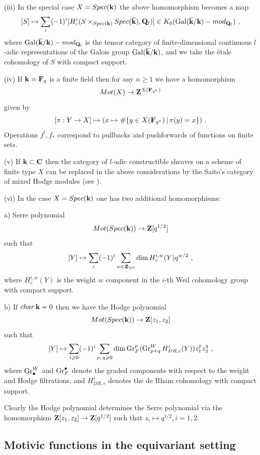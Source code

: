 \documentclass[12pt]{article}
\begin{document}
(iii) In the special case $X=Spec({\bf k})$ the above homomorphism becomes a map
$$[S]\mapsto \sum_i(-1)^i[H^i_{c}(S\times_{Spec ({\bf k})} Spec (\overline{{\bf k}}),{\bf Q}_l)]\in 
K_0(\operatorname{Gal}(\overline{{\bf k}}/{\bf k})-mod_{{\bf Q}_l})\,\,,$$
where $\operatorname{Gal}(\overline{{\bf k}}/{\bf k})-mod_{{\bf Q}_l}$ is the tensor category of finite-dimensional continuous
 $l$-adic representations of the Galois group $\operatorname{Gal}(\overline{{\bf k}}/{\bf k})$, and we take the \'etale cohomology of $S$ with compact support. 

(iv) If ${\bf k}={\bf F}_q$ is a finite field then for any $n\geqslant 1$ we have a homomorphism
$$Mot(X)\to {\bf Z}^{X({\bf F}_{q^n})}$$
 given by $$[\pi:Y\to X]\mapsto (x\mapsto \#\{y\in X({\bf F}_{q^n})\,|\,\pi(y)=x\})\,\, 
.$$
Operations $f^!,f_\ast$ correspond to  pullbacks and pushforwards of functions
on finite sets.


(v) If ${\bf k}\subset {\bf C}$ then the category of $l$-adic constructible sheaves on a scheme of finite type $X$ can be replaced in the above considerations by the Saito's category of mixed Hodge modules (see \cite{Sa}). 

(vi) In the case $X=Spec({\bf k})$ one has two additional homomorphisms:

a) Serre polynomial $$Mot(Spec({\bf k}))\to {\bf Z}[q^{1/2}]$$ such that
$$[Y]\mapsto \sum_i(-1)^i\sum_{w\in {{\bf Z}_{\geqslant 0}}}\dim H^{i,w}_c(Y)q^{w/2}\,\,,$$
where
$H^{i,w}_c(Y)$ is the weight $w$ component in the $i$-th Weil cohomology group with compact support.



b) If $char\,{\bf k}=0$ then we have the Hodge polynomial $$Mot(Spec({\bf k}))\to {\bf Z}[z_1,z_2]$$ such that
$$[Y]\mapsto \sum_{i\geqslant 0}(-1)^i\sum_{p,\,q\geqslant 0}\dim \operatorname{Gr}^p_F(\operatorname{Gr}^W_{p+q} H^i_{DR,c}(Y))z_1^{p}z_2^{q}\,\,,$$
where $\operatorname{Gr}^W_{\bullet} $ and $\operatorname{Gr}_F^{\bullet}$ denote the  graded components with respect to the weight and Hodge filtrations, and $H^i_{DR,c}$ denotes the de Rham cohomology with compact support.

Clearly the Hodge polynomial determines the Serre polynomial via the homomorphism ${\bf Z}[z_1,z_2]\to {\bf Z}[q^{1/2}]$ such that $z_i\mapsto q^{1/2}, i=1,2$.







\subsection{Motivic functions in the equivariant setting}
\end{document}
